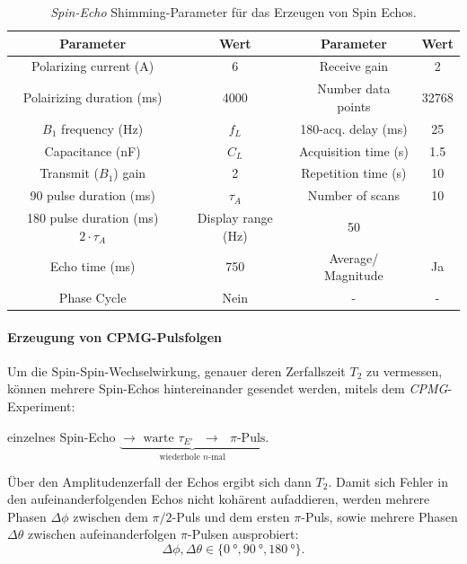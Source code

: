 \documentclass[../main.tex]{subfiles}
\begin{document}
        \begin{table}[H]
            \centering
            \begin{tabular}{cc|cc}
                 \textbf{Parameter} & \textbf{Wert} & \textbf{Parameter} & \textbf{Wert}  \\\hline\hline
                Polarizing current (\si{\ampere}) & 6 & Receive gain & 2\\\hline
                Polairizing duration (\si{\milli\second}) & 4000 & Number data points & 32768\\\hline
                $B_1$ frequency (\si{\hertz}) & $f_L$ & 180-acq. delay (\si{\milli\second}) & 25\\\hline
                Capacitance (\si{\nano\farad}) & $C_L$ & Acquisition time (\si{\second}) & \num{1.5}\\\hline
                Transmit ($B_1$) gain & 2 & Repetition time (\si{\second}) & 10\\\hline
                90 pulse duration (\si{\milli\second}) & $\tau_A$ & Number of scans & 10\\\hline
                180 pulse duration (\si{\milli\second}) $2\cdot\tau_A$ & Display range (\si{\hertz}) & 50\\\hline
                Echo time (\si{\milli\second}) & 750 & Average/ Magnitude & Ja\\\hline
                Phase Cycle & Nein  & - & -
            \end{tabular}
            \caption{\textit{Spin-Echo} Shimming-Parameter für das Erzeugen von Spin Echos.}
            \label{tab:DurchfuehrungTeil9ParameterEcho}
        \end{table}

    \paragraph{Erzeugung von CPMG-Pulsfolgen}
        Um die Spin-Spin-Wechselwirkung, genauer deren Zerfallszeit $T_2$ zu vermessen, können mehrere Spin-Echos hintereinander gesendet werden, mitels dem \textit{CPMG}-Experiment:
        \begin{center}  
            einzelnes Spin-Echo $\underbrace{\longrightarrow \text{ warte $\tau_{E'}$ } \longrightarrow \text{     $\pi$-Puls}}_{\text{wiederhole $n$-mal}}$.
        \end{center}

        Über den Amplitudenzerfall der Echos ergibt sich dann $T_2$. Damit sich Fehler in den aufeinanderfolgenden Echos nicht kohärent aufaddieren, werden mehrere Phasen $\Delta\phi$ zwischen dem $\pi/2$-Puls und dem ersten $\pi$-Puls, sowie mehrere Phasen $\Delta\theta$ zwischen aufeinanderfolgen $\pi$-Pulsen ausprobiert:
        \[
            \Delta\phi, \Delta\theta\in\{\SI{0}{\degree}, \SI{90}{\degree}, \SI{180}{\degree}\}.
        \]
\end{document}
